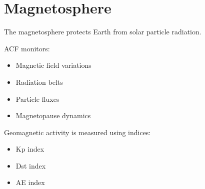\section{Magnetosphere}


The magnetosphere protects Earth from solar particle radiation.



ACF monitors:


\begin{itemize}

\item Magnetic field variations

\item Radiation belts

\item Particle fluxes

\item Magnetopause dynamics

\end{itemize}



Geomagnetic activity is measured using indices:


\begin{itemize}

\item Kp index

\item Dst index

\item AE index

\end{itemize}
